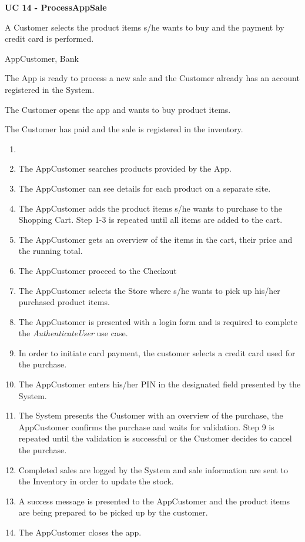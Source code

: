 \textbf{UC 14 - ProcessAppSale}
\begin{description}[font=\normalfont\itshape]

\item[Brief Description] A Customer selects the product items s/he wants to buy and the payment by credit card is performed.

\item[Involved Actors] AppCustomer, Bank

\item[Precondition] The App is ready to process a new sale and the Customer already has an account registered in the System.

\item[Trigger] The Customer opens the app and wants to buy product items.

\item[Postcondition] The Customer has paid and the sale is registered in the inventory.

\item[Standard Process]

\begin{enumerate}[leftmargin=.5cm]
\item[]
	\item The AppCustomer searches products provided by the App.
	\item The AppCustomer can see details for each product on a separate site.
	\item The AppCustomer adds the product items s/he wants to purchase to the Shopping Cart. Step 1-3 is repeated until all items are added to the cart.
	\item The AppCustomer gets an overview of the items in the cart, their price and the running total.
	\item The AppCustomer proceed to the Checkout 
	\item The AppCustomer selects the Store where s/he wants to pick up his/her	purchased product items. 
	\item The AppCustomer is presented with a login form and is required to complete the \textit{AuthenticateUser} use case.
	\item In order to initiate card payment, the customer selects a credit card used for the purchase.
	\item The AppCustomer enters his/her PIN in the designated field presented by the System.
	\item The System presents the Customer with an overview of the purchase, the AppCustomer confirms the purchase and waits for validation. Step 9 is repeated until the validation is successful or the Customer decides to cancel the purchase.
	\item Completed sales are logged by the System and sale information are sent to	the Inventory in order to update the stock.
	\item A success message is presented to the AppCustomer and the product items
	are being prepared to be picked up by the customer.
	\item The AppCustomer closes the app.
\end{enumerate}


\end{description}
